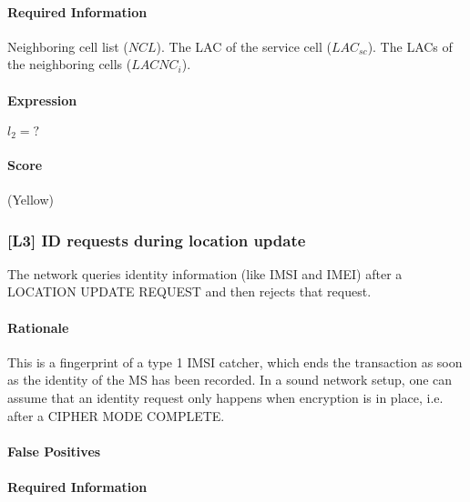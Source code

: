 \documentclass[a4paper,11pt,notitlepage,bigheadings,oneside]{scrartcl}
\begin{document}
\TBD{}

\paragraph{Required Information}

Neighboring cell list ($NCL$). The LAC of the service cell ($LAC_{sc}$). The
LACs of the neighboring cells ($LACNC_i$).

\paragraph{Expression}

$l_2 = ?$

\TBD{}

\paragraph{Score}

\TBD{} (Yellow)

\subsubsection{[L3] ID requests during location update}

The network queries identity information (like IMSI and IMEI) after a LOCATION
UPDATE REQUEST and then rejects that request.

\paragraph{Rationale}

This is a fingerprint of a type 1 IMSI catcher, which ends the transaction as
soon as the identity of the MS has been recorded. In a sound network setup, one
can assume that an identity request only happens when encryption is in place,
i.e. after a CIPHER MODE COMPLETE.

\paragraph{False Positives}


\paragraph{Required Information}
\end{document}
